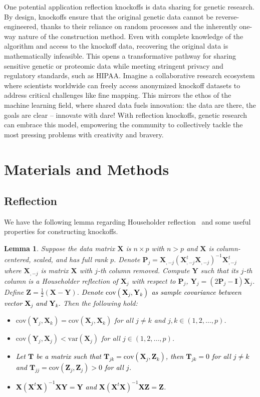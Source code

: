 \documentclass[12pt,Times]{article}
\def\cite{\citep}
\def\tcb{\textcolor{black}}
\def\T{{\mathbf{T}}}
\def\X{{\mathbf{X}}}
\def\Y{{\mathbf{Y}}}
\def\Z{{\mathbf{Z}}}
\def\I{{\mathbf{I}}}
\def\P{{\mathbf{P}}}
\def\cov{{\textrm{cov}}}
\def\var{{\textrm{var}}}
\newtheorem{lemma}[theorem]{Lemma}
\begin{document}
One potential application reflection knockoffs is data sharing for genetic research. By design, knockoffs ensure that the original genetic data cannot be reverse-engineered, thanks to their reliance on random processes and the inherently one-way nature of the construction method. Even with complete knowledge of the algorithm and access to the knockoff data, recovering the original data is mathematically infeasible.
This opens a transformative pathway for sharing sensitive genetic or proteomic data while meeting stringent privacy and regulatory standards, such as HIPAA. Imagine a collaborative research ecosystem where scientists worldwide can freely access anonymized knockoff datasets to address critical challenges like fine mapping. This mirrors the ethos of the machine learning field, where shared data fuels innovation: 
the data are there, the goals are clear -- innovate with dare!  
With reflection knockoffs, genetic research can embrace this model, empowering the community to collectively tackle the most pressing problems with creativity and bravery.


\section{Materials and Methods}
\subsection{Reflection}
We have the following lemma regarding Householder reflection~\cite[c.f.][]{golub.13} and some useful properties for constructing knockoffs. 

\begin{lemma}\label{lem1}
Suppose the data matrix $\X$ is $n \times p$ with $n > p$ and $\X$ is column-centered, scaled, and has full rank $p$. 
Denote $\P_j = \X_{,-j} (\X_{,-j}^t  \X_{,-j} )^{-1}  \X_{,-j}^t $ where $\X_{,-j}$ is matrix $\X$ with $j$-th column removed. 
Compute $\Y$ such that its $j$-th column is a Householder reflection of $\X_j$ with respect to $\P_j$, $\Y_j = (2 \P_j - \I)  \X_j$. 
Define $\Z = \frac{1}{2}(\X -\Y)$. 
\tcb{Denote $\cov(\X_j, \Y_k)$ as sample covariance between vector $\X_j$ and $\Y_k$. }
Then the following hold: 
\begin{itemize}
 \item[a)] $\cov(\Y_j, \X_k) = \cov(\X_j, \X_k)$ for all $j \neq k$ and $j,k \in (1,2,\dots, p)$. 
 \item[b)] $\cov(\Y_j, \X_j) < \var(\X_j)$ for all $j \in (1,2,\dots, p)$. 
 \item[c)] \tcb{Let $\T$ be a matrix such that $\T_{jk} = \cov(\X_j, \Z_k)$, then $\T_{jk} = 0$ for all $j\ne k$ and $\T_{jj} = \cov(\Z_j, \Z_j) > 0$ for all $j$.}     
 \item[d)] \tcb{$\X(\X^t\X)^{-1}\X \Y = \Y$ and $\X(\X^t\X)^{-1}\X \Z = \Z$.} 
 \end{itemize}
\end{lemma}
\end{document}
